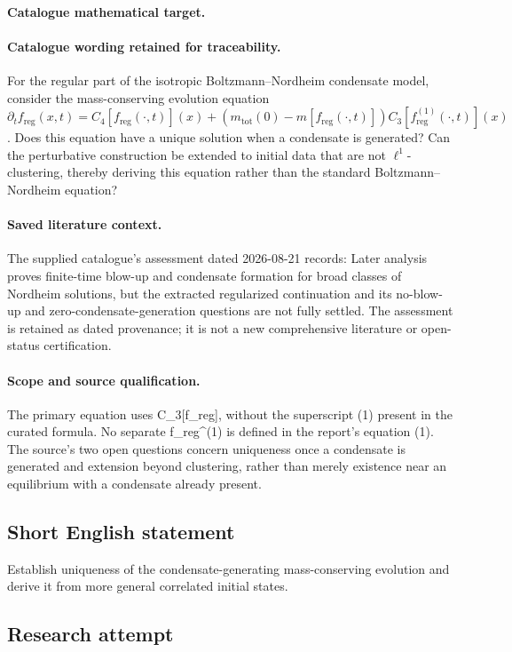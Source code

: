 \documentclass[11pt]{article}
\begin{document}
\paragraph{Catalogue mathematical target.}
\paragraph{Catalogue wording retained for traceability.}
For the regular part of the isotropic Boltzmann–Nordheim condensate model, consider the mass-conserving evolution equation $\partial_t f_{\mathrm{reg}}(x,t)=C_4[f_{\mathrm{reg}}(\cdot,t)](x)+(m_{\mathrm{tot}}(0)-m[f_{\mathrm{reg}}(\cdot,t)])C_3[f_{\mathrm{reg}}^{(1)}(\cdot,t)](x)$. Does this equation have a unique solution when a condensate is generated? Can the perturbative construction be extended to initial data that are not $\ell^1$-clustering, thereby deriving this equation rather than the standard Boltzmann–Nordheim equation?

\paragraph{Saved literature context.} The supplied catalogue's assessment dated 2026-08-21 records: Later analysis proves finite-time blow-up and condensate formation for broad classes of Nordheim solutions, but the extracted regularized continuation and its no-blow-up and zero-condensate-generation questions are not fully settled. The assessment is retained as dated provenance; it is not a new comprehensive literature or open-status certification.
\paragraph{Scope and source qualification.}The primary equation uses C_3[f_reg], without the superscript (1) present in the curated formula. No separate f_reg^(1) is defined in the report's equation (1). The source's two open questions concern uniqueness once a condensate is generated and extension beyond clustering, rather than merely existence near an equilibrium with a condensate already present.
\subsection{Short English statement}
Establish uniqueness of the condensate-generating mass-conserving evolution and derive it from more general correlated initial states.
\subsection{Research attempt}
\end{document}
